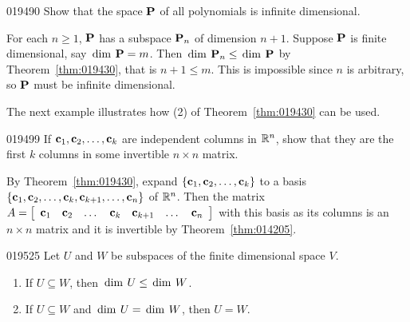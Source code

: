 \begin{example}{}{019490}
Show that the space $\textbf{P}$ of all polynomials is infinite dimensional.

\begin{solution}
For each $n \geq 1$, $\textbf{P}$ has a subspace $\textbf{P}_{n}$ of dimension $n + 1$. Suppose $\textbf{P}$ is finite dimensional, say $\thinspace\operatorname{dim\medspace} \textbf{P} = m$. Then $\thinspace\operatorname{dim\medspace} \textbf{P}_{n} \leq \thinspace\operatorname{dim\medspace} \textbf{P}$ by Theorem~\ref{thm:019430}, that is $n + 1 \leq m$. This is impossible since $n$ is arbitrary, so $\textbf{P}$ must be infinite dimensional.
\end{solution}
\end{example}

The next example illustrates how (2) of Theorem~\ref{thm:019430} can be used.

\begin{example}{}{019499}
If $\textbf{c}_{1}, \textbf{c}_{2}, \dots, \textbf{c}_{k}$ are independent columns in $\mathbb{R}^n$, show that they are the first $k$ columns in some invertible $n \times n$ matrix.

\begin{solution}
By Theorem~\ref{thm:019430}, expand $\{\textbf{c}_{1}, \textbf{c}_{2}, \dots, \textbf{c}_{k}\}$ to a basis $\{\textbf{c}_{1}, \textbf{c}_{2}, \dots, \textbf{c}_{k}, \textbf{c}_{k+1}, \dots, \textbf{c}_{n}\}$ of $\mathbb{R}^n$. Then the matrix $A = 
\left[ \begin{array}{ccccccc}
\textbf{c}_{1} & \textbf{c}_{2} & \dots & \textbf{c}_{k} & \textbf{c}_{k+1} & \dots & \textbf{c}_{n} 
\end{array} \right]$
with this basis as its columns is an $n \times n$ matrix and it is invertible by Theorem~\ref{thm:014205}.
\end{solution}
\end{example}

\begin{theorem}{}{019525}
Let $U$ and $W$ be subspaces of the finite dimensional space $V$.

\begin{enumerate}
\item If $U \subseteq W$, then $\thinspace\operatorname{dim\medspace} U \leq \thinspace\operatorname{dim\medspace} W$.

\item If $U \subseteq W$ and $\thinspace\operatorname{dim\medspace} U = \thinspace\operatorname{dim\medspace} W$, then $U = W$.

\end{enumerate}
\end{theorem}

